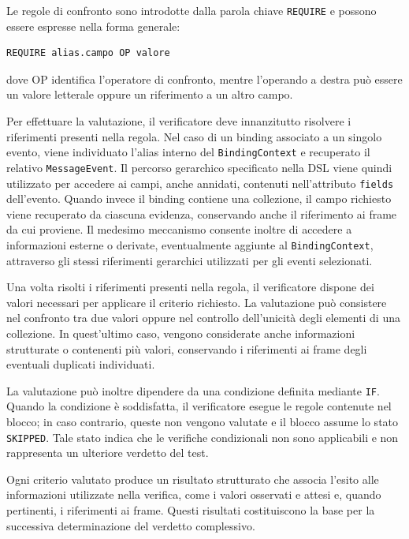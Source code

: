 Le regole di confronto sono introdotte dalla parola chiave \texttt{REQUIRE} e possono essere espresse nella forma generale:

\par\noindent\begin{minipage}{\linewidth}
\begin{lstlisting}
REQUIRE alias.campo OP valore
\end{lstlisting}
\end{minipage}\par

dove OP identifica l'operatore di confronto, mentre l'operando a destra può essere un valore letterale oppure un riferimento a un altro campo.

Per effettuare la valutazione, il verificatore deve innanzitutto risolvere i riferimenti presenti nella regola. Nel caso di un binding associato a un singolo evento, viene individuato l'alias interno del \texttt{BindingContext} e recuperato il relativo \texttt{MessageEvent}. Il percorso gerarchico specificato nella DSL viene quindi utilizzato per accedere ai campi, anche annidati, contenuti nell'attributo \texttt{fields} dell'evento. Quando invece il binding contiene una collezione, il campo richiesto viene recuperato da ciascuna evidenza, conservando anche il riferimento ai frame da cui proviene. Il medesimo meccanismo consente inoltre di accedere a informazioni esterne o derivate, eventualmente aggiunte al \texttt{BindingContext}, attraverso gli stessi riferimenti gerarchici utilizzati per gli eventi selezionati.

Una volta risolti i riferimenti presenti nella regola, il verificatore dispone dei valori necessari per applicare il criterio richiesto. La valutazione può consistere nel confronto tra due valori oppure nel controllo dell'unicità degli elementi di una collezione. In quest'ultimo caso, vengono considerate anche informazioni strutturate o contenenti più valori, conservando i riferimenti ai frame degli eventuali duplicati individuati.

La valutazione può inoltre dipendere da una condizione definita mediante \texttt{IF}. Quando la condizione è soddisfatta, il verificatore esegue le regole contenute nel blocco; in caso contrario, queste non vengono valutate e il blocco assume lo stato \texttt{SKIPPED}. Tale stato indica che le verifiche condizionali non sono applicabili e non rappresenta un ulteriore verdetto del test.

Ogni criterio valutato produce un risultato strutturato che associa l'esito alle informazioni utilizzate nella verifica, come i valori osservati e attesi e, quando pertinenti, i riferimenti ai frame. Questi risultati costituiscono la base per la successiva determinazione del verdetto complessivo.

